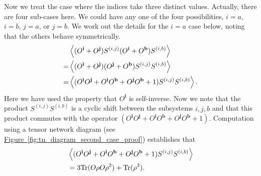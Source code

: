 \documentclass[
amsmath,
amssymb,
aps,
pra,
reprint,
twocolumn,
superscriptaddress,
longbibliography,
showkeys,
floatfix
]{revtex4-1}
\def\tr{\mathrm{Tr}}
\newcommand{\fig}[1]{\hyperref[fig:#1]{Figure~\ref*{fig:#1}}}
\begin{document}
Now we treat the case where the indices take three distinct values. 
Actually, there are four sub-cases here. 
We could have any one of the four possibilities, \(i=a\), \(i=b\), \(j=a\), or
\(j=b\). 
We work out the details for the \(i=a\) case below, noting that the others
behave symmetrically.
\begin{align}
  & \ev{ (O^\textbf{i} + O^\textbf{j})S^{(i,j)}(O^\textbf{i} + O^\textbf{b}) S^{(i, b)}} \\
  = & \ev{(O^\textbf{i} + O^\textbf{j}) (O^\textbf{j} + O^\textbf{b}) S^{(i, j)}S^{(i, b)}} \\
  = & \ev{(O^\textbf{i}O^\textbf{j} + O^\textbf{i}O^\textbf{b} + O^\textbf{j}O^\textbf{b} + 1) S^{(i, j)}S^{(i, b)}}.
\end{align}
Here we have used the property that \(O^\textbf{i}\) is self-inverse. 
Now we note that the product \(S^{(i, j)}S^{(i, b)}\) is a cyclic shift between
the subsystems \(i, j, b\) and that this product commutes with the operator
\((O^\textbf{i}O^\textbf{j} + O^\textbf{i}O^\textbf{b} +
O^\textbf{j}O^\textbf{b} + 1)\). 
Computation using a tensor network diagram (see
\fig{tn_diagram_second_case_proof}) establishes that
\begin{align}
  & \ev{(O^\textbf{i}O^\textbf{j} + O^\textbf{i}O^\textbf{b} + O^\textbf{j}O^\textbf{b} + 1) S^{(i, j)}S^{(i, b)}} \\
  &= 3\tr(O \rho O \rho^2) + \tr(\rho^3).
    \label{eq:second_case_simplification}
\end{align}
\end{document}
